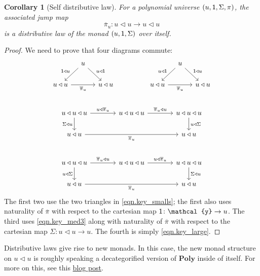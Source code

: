 \documentclass[11pt, one side, article]{memoir}
\theoremstyle{definition}
\theoremstyle{plain}
\newtheorem{corollary}[definitionx]{Corollary}
\newcommand{\Cat}[1]{\mathbf{#1}}%
\newcommand{\ol}[1]{\overline{#1}}
\newcommand{\yon}{\mathcal{y}}
\newcommand{\poly}{\Cat{Poly}}
\newcommand{\0}{\textsf{0}}
\newcommand{\1}{\tn{\textsf{1}}}
\newcommand{\tri}{\mathbin{\triangleleft}}
\newcommand{\jump}{\pi}
\newcommand{\jumpmap}{\ol{\jump}}
\begin{document}
\begin{corollary}[Self distributive law]\label{cor.distributive_law}
For a polynomial universe $(u,\1,\Sigma,\pi)$, the associated jump map
\[\jumpmap_u\colon u\tri u\to u\tri u\]
is a distributive law of the monad $(u,\1,\Sigma)$ over itself.
\end{corollary}
\begin{proof}
We need to prove that four diagrams commute:
\begin{gather*}
\begin{tikzcd}[column sep=10pt, ampersand replacement=\&]
	\&u\ar[dl, "\1\tri u"']\ar[dr, "u\tri\1"]\\
	u\tri u\ar[rr, "\jumpmap_u"']\&\&u\tri u
\end{tikzcd}
\hspace{.6in}
\begin{tikzcd}[column sep=10pt, ampersand replacement=\&]
	\&u\ar[dl, "u\tri \1"']\ar[dr, "\1\tri u"]\\
	u\tri u\ar[rr, "\jumpmap_u"']\&\&u\tri u
\end{tikzcd}
\\[15pt]
\begin{tikzcd}[column sep=large, ampersand replacement=\&]
	u\tri u\tri u\ar[r, "u\tri\jumpmap_u"]\ar[d, "\Sigma\tri u"']\&
	u\tri u\tri u\ar[r, "\jumpmap_u\tri u"]
	\&u\tri u\tri u\ar[d, "u\tri\Sigma"]\\
	u\tri u\ar[rr, "\jumpmap_u"']
	\&\&
	u\tri u
\end{tikzcd}
\\[15pt]
\begin{tikzcd}[column sep=large, ampersand replacement=\&]
	u\tri u\tri u\ar[r, "\jumpmap_u\tri u"]\ar[d, "u\tri\Sigma"']\&
	u\tri u\tri u\ar[r, "u\tri\jumpmap_u"]
	\&u\tri u\tri u\ar[d, "\Sigma\tri u"]\\
	u\tri u\ar[rr, "\jumpmap_u"']
	\&\&
	u\tri u
\end{tikzcd}
\end{gather*}
The first two use the two triangles in \eqref{eqn.key_smalls}; the first also uses naturality of $\jumpmap$ with respect to the cartesian map $\1\colon\yon\to u$. The third uses \cref{eqn.key_med3} along with naturality of $\jumpmap$ with respect to the cartesian map $\Sigma\colon u\tri u\to u$. The fourth is simply \eqref{eqn.key_large}.
\end{proof}

Distributive laws give rise to new monads. In this case, the new monad structure on $u\tri u$ is roughly speaking a decategorified version of $\poly$ inside of itself. For more on this, see this \href{https://topos.site/blog/2021/09/poly-inside-poly/}{blog post}.
\end{document}
